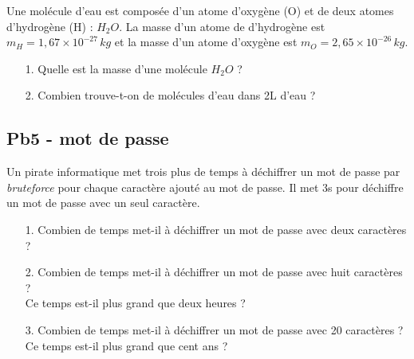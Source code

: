Une molécule d'eau est composée d'un atome d'oxygène (O) et de deux atomes d'hydrogène (H) : $H_{2}O$. La masse d'un atome de d'hydrogène est $m_H = 1,67\times 10^{-27} \,kg$ et la masse d'un atome d'oxygène est $ m_O = 2,65 \times 10^{-26} \,kg$. \\

\begin{itemize}
  \item[1.] Quelle est la masse d'une molécule $H_{2}O$ ? 
  \item[2.] Combien trouve-t-on de molécules d'eau dans 2L d'eau ?
\end{itemize}

\Pointilles[7]

\subsection*{Pb5 - mot de passe}

Un pirate informatique met trois plus de temps à déchiffrer un mot de passe par \textit{bruteforce} pour chaque caractère ajouté au mot de passe. Il met 3s pour déchiffre un mot de passe avec un seul caractère.  

\begin{itemize}
  \item[1.] Combien de temps met-il à déchiffrer un mot de passe avec deux caractères ?
  \item[2.] Combien de temps met-il à déchiffrer un mot de passe avec huit caractères ? \\
  Ce temps est-il plus grand que deux heures ?
  \item[3.] Combien de temps met-il à déchiffrer un mot de passe avec 20 caractères ? \\
  Ce temps est-il plus grand que cent ans ?
\end{itemize}


\Pointilles[14]



